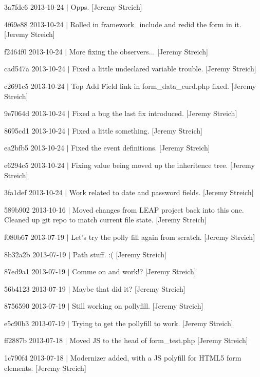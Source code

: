 \begin{DoxyItemize}
\item 3a7fdc6 2013-\/10-\/24 $|$ Opps. \mbox{[}Jeremy Streich\mbox{]}
\item 4f69e88 2013-\/10-\/24 $|$ Rolled in framework\-\_\-include and redid the form in it. \mbox{[}Jeremy Streich\mbox{]}
\item f2464f0 2013-\/10-\/24 $|$ More fixing the observers... \mbox{[}Jeremy Streich\mbox{]}
\item cad547a 2013-\/10-\/24 $|$ Fixed a little undeclared variable trouble. \mbox{[}Jeremy Streich\mbox{]}
\item c2691c5 2013-\/10-\/24 $|$ Top Add Field link in form\-\_\-data\-\_\-curd.\-php fixed. \mbox{[}Jeremy Streich\mbox{]}
\item 9e7064d 2013-\/10-\/24 $|$ Fixed a bug the last fix introduced. \mbox{[}Jeremy Streich\mbox{]}
\item 8695cd1 2013-\/10-\/24 $|$ Fixed a little something. \mbox{[}Jeremy Streich\mbox{]}
\item ea2bfb5 2013-\/10-\/24 $|$ Fixed the event definitions. \mbox{[}Jeremy Streich\mbox{]}
\item e6294c5 2013-\/10-\/24 $|$ Fixing value being moved up the inheritence tree. \mbox{[}Jeremy Streich\mbox{]}
\item 3fa1def 2013-\/10-\/24 $|$ Work related to date and password fields. \mbox{[}Jeremy Streich\mbox{]}
\item 589b902 2013-\/10-\/16 $|$ Moved changes from L\-E\-A\-P project back into this one. Cleaned up git repo to match current file state. \mbox{[}Jeremy Streich\mbox{]}
\item f080b67 2013-\/07-\/19 $|$ Let's try the polly fill again from scratch. \mbox{[}Jeremy Streich\mbox{]}
\item 8b32a2b 2013-\/07-\/19 $|$ Path stuff. \-:( \mbox{[}Jeremy Streich\mbox{]}
\item 87ed9a1 2013-\/07-\/19 $|$ Comme on and work!? \mbox{[}Jeremy Streich\mbox{]}
\item 56b4123 2013-\/07-\/19 $|$ Maybe that did it? \mbox{[}Jeremy Streich\mbox{]}
\item 8756590 2013-\/07-\/19 $|$ Still working on pollyfill. \mbox{[}Jeremy Streich\mbox{]}
\item e5c90b3 2013-\/07-\/19 $|$ Trying to get the pollyfill to work. \mbox{[}Jeremy Streich\mbox{]}
\item ff2887b 2013-\/07-\/18 $|$ Moved J\-S to the head of form\-\_\-test.\-php \mbox{[}Jeremy Streich\mbox{]}
\item 1c790f4 2013-\/07-\/18 $|$ Modernizer added, with a J\-S polyfill for H\-T\-M\-L5 form elements. \mbox{[}Jeremy Streich\mbox{]}

\end{DoxyItemize}

